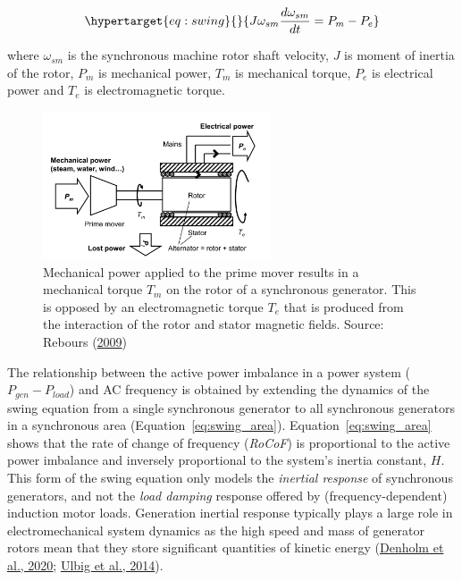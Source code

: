 \documentclass[12pt,a4paper,]{report}
\begin{document}
\begin{equation}\protect\hypertarget{eq:swing}{}{J\omega_{sm}\frac{d\omega_{sm}}{dt} = P_m - P_e}\label{eq:swing}\end{equation}

where \(\omega_{sm}\) is the synchronous machine rotor shaft velocity,
\(J\) is moment of inertia of the rotor, \(P_m\) is mechanical power,
\(T_m\) is mechanical torque, \(P_e\) is electrical power and \(T_e\) is
electromagnetic torque.

\begin{figure}
\hypertarget{fig:synch_torques}{%
\centering
\includegraphics[width=0.6\textwidth,height=\textheight]{source/figures/swing.png}
\caption[Mechanical and electromagnetic torques on a synchronous
generator]{Mechanical power applied to the prime mover results in a
mechanical torque \(T_m\) on the rotor of a synchronous generator. This
is opposed by an electromagnetic torque \(T_e\) that is produced from
the interaction of the rotor and stator magnetic fields. Source: Rebours
(\protect\hyperlink{ref-reboursComprehensiveAssessmentMarkets2009}{2009})}\label{fig:synch_torques}
}
\end{figure}

The relationship between the active power imbalance in a power system
(\(P_{gen}-P_{load}\)) and AC frequency is obtained by extending the
dynamics of the swing equation from a single synchronous generator to
all synchronous generators in a synchronous area
(Equation~\ref{eq:swing_area}). Equation~\ref{eq:swing_area} shows that
the rate of change of frequency (\emph{RoCoF}) is proportional to the
active power imbalance and inversely proportional to the system's
inertia constant, \(H\). This form of the swing equation only models the
\emph{inertial response} of synchronous generators, and not the
\emph{load damping} response offered by (frequency-dependent) induction
motor loads. Generation inertial response typically plays a large role
in electromechanical system dynamics as the high speed and mass of
generator rotors mean that they store significant quantities of kinetic
energy (\protect\hyperlink{ref-denholmInertiaPowerGrid2020}{Denholm et
al., 2020}; \protect\hyperlink{ref-ulbigImpactLowRotational2014}{Ulbig
et al., 2014}).
\end{document}
